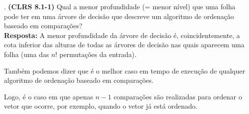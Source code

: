 
. \textbf{(CLRS 8.1-1)} Qual a menor profundidade (= menor nível) que uma folha pode ter em uma árvore de decisão que descreve um algoritmo de ordenação baseado em comparações?\\[6pt]
\textbf{Resposta:} A menor profundidade da árvore de decisão é, coincidentemente, a cota inferior das alturas de todas as árvores de decisão nas quais aparecem uma folha (uma das $n!$ permutações da entrada).

Também podemos dizer que é o melhor caso em tempo de execução de qualquer algoritmo de ordenação baseado em comparações.

Logo, é o caso em que apenas $n - 1$ comparações são realizadas para ordenar o vetor que ocorre, por exemplo, quando o vetor já está ordenado.\\[12pt]